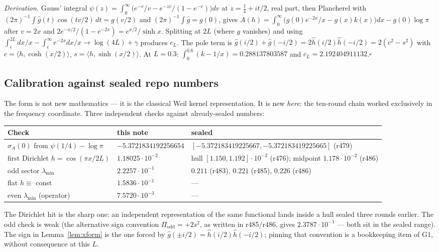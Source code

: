 \documentclass[11pt]{article}
\theoremstyle{remark}
\begin{document}
\noindent\emph{Derivation.}
Gauss' integral
$\psi(z)=\int_0^\infty\big(e^{-v}/v-e^{-zv}/(1-e^{-v})\big)dv$
at $z=\tfrac14+it/2$, real part, then Plancherel with
$(2\pi)^{-1}\int\hat g(t)\cos(tv/2)\,dt=g(v/2)$ and
$(2\pi)^{-1}\int\hat g=g(0)$, gives
$A(h)=\int_0^\infty\big(g(0)e^{-2x}/x-g(x)k(x)\big)dx
-g(0)\log\pi$
after $v=2x$ and
$2e^{-x/2}/(1-e^{-2x})=e^{x/2}/\sinh x$.
Splitting at $2L$ (where $g$ vanishes) and using
$\int_\epsilon^{2L}dx/x-\int_\epsilon^\infty e^{-2x}dx/x
\to\log(4L)+\gamma$
produces $c_L$.
The pole term is
$\hat g(i/2)+\hat g(-i/2)=2\hat h(i/2)\hat h(-i/2)
=2(c^2-s^2)$ with $c=\langle h,\cosh(x/2)\rangle$,
$s=\langle h,\sinh(x/2)\rangle$.
At $L=0.3$: $\int_0^{0.6}(k-1/x)=0.288137803587$ and
$c_L=2.192404911132$.\hfill$\square$

\subsection{Calibration against sealed repo numbers}

The form is not new mathematics --- it is the classical Weil
kernel representation.  It is new \emph{here}: the ten-round
chain worked exclusively in the frequency coordinate.
Three independent checks against already-sealed numbers:

\begin{center}
\small
\begin{tabular}{@{}lll@{}}
\toprule
Check & this note & sealed \\
\midrule
$\sigma_A(0)$ from $\psi(1/4)-\log\pi$
  & $-5.3721834192256654$
  & $[-5.372183419225667,-5.372183419225665]$ (r479) \\
first Dirichlet $h=\cos(\pi x/2L)$
  & $1.18025\cdot10^{-2}$
  & hull $[1.150,1.192]\cdot10^{-2}$ (r476);
    midpoint $1.178\cdot10^{-2}$ (r486) \\
odd sector $\lambda_{\min}$
  & $2.2257\cdot10^{-1}$
  & $0.211$ (r483), $0.221$ (r485), $0.226$ (r486) \\
flat $h\equiv$ const
  & $1.5836\cdot10^{-1}$ & --- \\
even $\lambda_{\min}$ (operator)
  & $7.5720\cdot10^{-3}$ & --- \\
\bottomrule
\end{tabular}
\end{center}

The Dirichlet hit is the sharp one: an independent
representation of the same functional lands inside a hull
sealed three rounds earlier.
The odd check is weak (the alternative sign convention
$\Pi_{\mathrm{odd}}=+2s^2$, as written in r485/r486, gives
$2.3787\cdot10^{-1}$ --- both sit in the sealed range).
The sign in Lemma~\ref{lem:xform} is the one forced by
$\hat g(\pm i/2)=\hat h(i/2)\hat h(-i/2)$; pinning that
convention is a bookkeeping item of G1, without consequence at
this $L$.
\end{document}
